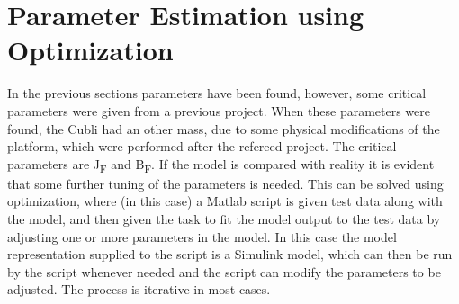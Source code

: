 \section{Parameter Estimation using Optimization}
In the previous sections parameters have been found, however, some critical parameters were given from a previous project. When these parameters were found, the Cubli had an other mass, due to some physical modifications of the platform, which were performed after the refereed project. The critical parameters are \si{J_F} and \si{B_F}. If the model is compared with reality it is evident that some further tuning of the parameters is needed. This can be solved using optimization, where (in this case) a Matlab script is given test data along with the model, and then given the task to fit the model output to the test data by adjusting one or more parameters in the model. In this case the model representation supplied to the script is a Simulink model, which can then be run by the script whenever needed and the script can modify the parameters to be adjusted. The process is iterative in most cases.


